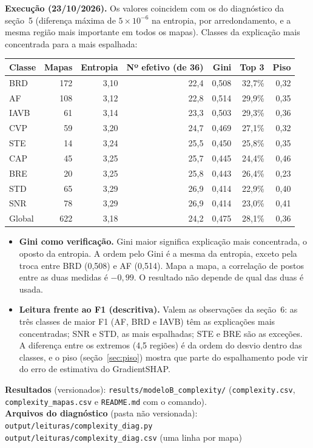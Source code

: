 \documentclass[11pt,a4paper]{article}
\begin{document}
\textbf{Execução (23/10/2026).} Os valores coincidem com os do diagnóstico da seção~5 (diferença máxima de $5 \times 10^{-6}$ na entropia, por arredondamento, e a mesma região mais importante em todos os mapas). Classes da explicação mais concentrada para a mais espalhada:
\begin{center}\small
\begin{tabular}{lrrrrrr}
\toprule
\textbf{Classe} & \textbf{Mapas} & \textbf{Entropia} & \textbf{Nº efetivo (de 36)} & \textbf{Gini} & \textbf{Top 3} & \textbf{Piso} \\
\midrule
BRD  & 172 & 3,10 & 22,4 & 0,508 & 32,7\% & 0,32 \\
AF   & 108 & 3,12 & 22,8 & 0,514 & 29,9\% & 0,35 \\
IAVB &  61 & 3,14 & 23,3 & 0,503 & 29,3\% & 0,36 \\
CVP  &  59 & 3,20 & 24,7 & 0,469 & 27,1\% & 0,32 \\
STE  &  14 & 3,24 & 25,5 & 0,450 & 25,8\% & 0,35 \\
CAP  &  45 & 3,25 & 25,7 & 0,445 & 24,4\% & 0,46 \\
BRE  &  20 & 3,25 & 25,8 & 0,443 & 26,4\% & 0,23 \\
STD  &  65 & 3,29 & 26,9 & 0,414 & 22,9\% & 0,40 \\
SNR  &  78 & 3,29 & 26,9 & 0,414 & 23,0\% & 0,41 \\
\midrule
Global & 622 & 3,18 & 24,2 & 0,475 & 28,1\% & 0,36 \\
\bottomrule
\end{tabular}
\end{center}
\begin{itemize}
\item \textbf{Gini como verificação.} Gini maior significa explicação mais concentrada, o oposto da entropia. A ordem pelo Gini é a mesma da entropia, exceto pela troca entre BRD (0,508) e AF (0,514). Mapa a mapa, a correlação de postos entre as duas medidas é $-0{,}99$. O resultado não depende de qual das duas é usada.
\item \textbf{Leitura frente ao F1 (descritiva).} Valem as observações da seção~6: as três classes de maior F1 (AF, BRD e IAVB) têm as explicações mais concentradas; SNR e STD, as mais espalhadas; STE e BRE são as exceções. A diferença entre os extremos (4,5 regiões) é da ordem do desvio dentro das classes, e o piso (seção~\ref{sec:piso}) mostra que parte do espalhamento pode vir do erro de estimativa do GradientSHAP.
\end{itemize}

\vspace{0.5em}
{\small \textbf{Resultados} (versionados): \texttt{results/modeloB\_complexity/} (\texttt{complexity.csv}, \texttt{complexity\_mapas.csv} e \texttt{README.md} com o comando). \\
\textbf{Arquivos do diagnóstico} (pasta não versionada): \\ \texttt{output/leituras/complexity\_diag.py} \\ \texttt{output/leituras/complexity\_diag.csv} (uma linha por mapa)}
\end{document}
